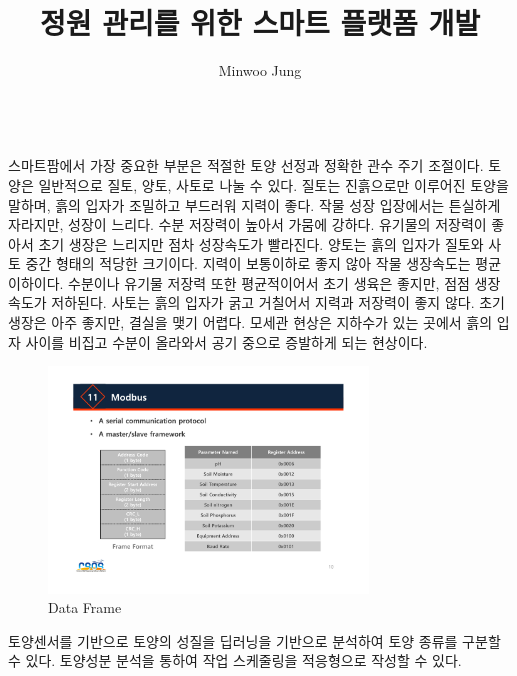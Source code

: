 \documentclass[11pt]{article}
\title{정원 관리를 위한 스마트 플랫폼 개발}
\author{Minwoo Jung}
\begin{document}
\maketitle

\indent \\스마트팜에서 가장 중요한 부분은 적절한 토양 선정과 정확한 관수 주기 조절이다. 토양은 일반적으로 질토, 양토, 사토로 나눌 수 있다.
질토는 진흙으로만 이루어진 토양을 말하며, 흙의 입자가 조밀하고 부드러워 지력이 좋다. 작물 성장 입장에서는 튼실하게 자라지만, 성장이 느리다. 수분 저장력이 높아서 가뭄에 강하다. 유기물의 저장력이 좋아서 초기 생장은 느리지만 점차 성장속도가 빨라진다.
양토는 흙의 입자가 질토와 사토 중간 형태의 적당한 크기이다. 지력이 보통이하로 좋지 않아 작물 생장속도는 평균 이하이다. 수분이나 유기물 저장력 또한 평균적이어서 초기 생육은 좋지만, 점점 생장속도가 저하된다.
사토는 흙의 입자가 굵고 거칠어서 지력과 저장력이 좋지 않다. 초기 생장은 아주 좋지만, 결실을 맺기 어렵다. 
모세관 현상은 지하수가 있는 곳에서 흙의 입자 사이를 비집고 수분이 올라와서 공기 중으로 증발하게 되는 현상이다. 


\begin{figure}[!htbp]
    \centering
       \includegraphics[width=8.5cm]{../Figure/Frame_format.pdf}
       \hfil
    \caption{Data Frame}
    \label{Data_Frame}
\end{figure}

토양센서를 기반으로 토양의 성질을 딥러닝을 기반으로 분석하여 토양 종류를 구분할 수 있다. 토양성분 분석을 통하여 작업 스케줄링을 적응형으로 작성할 수 있다. 


\indent \\
\end{document}
